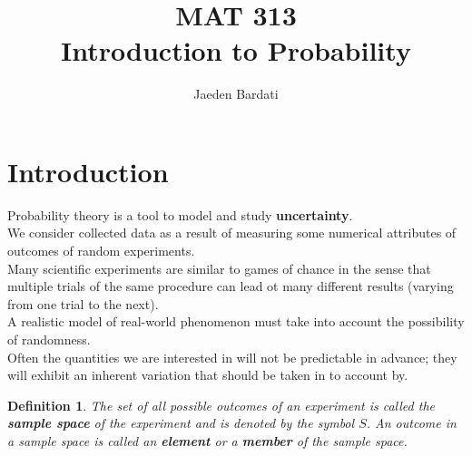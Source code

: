 \documentclass[]{article}
\title{
	MAT 313 \\
	\large Introduction to Probability
}
\author{Jaeden Bardati}
\date{}
\newtheorem{definition}{Definition}	%
\begin{document}
\maketitle

\section{Introduction}

Probability theory is a tool to model and study \textbf{uncertainty}.\\

We consider collected data as a result of measuring some numerical attributes of outcomes of random experiments.\\

Many scientific experiments are similar to games of chance in the sense that multiple trials of the same procedure can lead ot many different results (varying from one trial to the next).\\

A realistic model of real-world phenomenon must take into account the possibility of randomness.\\

Often the quantities we are interested in will not be predictable in advance; they will exhibit an inherent variation that should be taken in to account by. \\

\begin{definition}
	The set of all possible outcomes of an experiment is called the \textbf{sample space} of the experiment and is denoted by the symbol $S$.
	An outcome in a sample space is called an \textbf{element} or a \textbf{member} of the sample space.
\end{definition}
\end{document}
